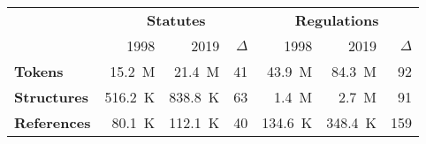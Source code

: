 \begin{tabular}{lrrrrrr}
\toprule & \multicolumn{3}{c}{\textbf{Statutes}} & \multicolumn{3}{c}{\textbf{Regulations}} \\
            & 1998   & 2019   &   $\Delta$ & 1998   & 2019   &   $\Delta$ \\
\midrule
 \textbf{Tokens}     & 15.2~M               & 21.4~M               &                      41 & 43.9~M                  & 84.3~M                  &                         92 \\
 \textbf{Structures} & 516.2~K              & 838.8~K              &                      63 & 1.4~M                   & 2.7~M                   &                         91 \\
 \textbf{References} & 80.1~K               & 112.1~K              &                      40 & 134.6~K                 & 348.4~K                 &                        159 \\
\bottomrule
\end{tabular}